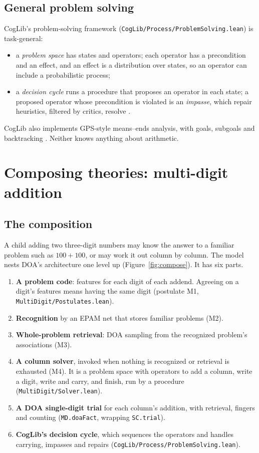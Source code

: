 \documentclass[11pt]{article}
\newcommand{\code}[1]{\texttt{#1}}
\begin{document}
\subsection{General problem solving}
\label{sec:ps}

CogLib's problem-solving framework (\code{CogLib/Process/ProblemSolving.lean}) is task-general:
\begin{itemize}
  \item a \emph{problem space} has states and operators; each operator has a precondition and an effect, and an effect is a distribution over states, so an operator can include a probabilistic process;
  \item a \emph{decision cycle} runs a procedure that proposes an operator in each state; a proposed operator whose precondition is violated is an \emph{impasse}, which repair heuristics, filtered by critics, resolve \citep{brown1980}.
\end{itemize}
CogLib also implements GPS-style means--ends analysis, with goals, subgoals and backtracking \citep{newell1972}. Neither knows anything about arithmetic.

\section{Composing theories: multi-digit addition}
\label{sec:compose}

\subsection{The composition}

A child adding two three-digit numbers may know the answer to a familiar problem such as $100+100$, or may work it out column by column. The model nests DOA's architecture one level up (Figure~\ref{fig:compose}). It has six parts.

\begin{enumerate}
  \item \textbf{A problem code}: features for each digit of each addend. Agreeing on a digit's features means having the same digit (postulate M1, \code{MultiDigit/Postulates.lean}).
  \item \textbf{Recognition} by an EPAM net that stores familiar problems (M2).
  \item \textbf{Whole-problem retrieval}: DOA sampling from the recognized problem's associations (M3).
  \item \textbf{A column solver}, invoked when nothing is recognized or retrieval is exhausted (M4). It is a problem space with operators to add a column, write a digit, write and carry, and finish, run by a procedure (\code{MultiDigit/Solver.lean}).
  \item \textbf{A DOA single-digit trial} for each column's addition, with retrieval, fingers and counting (\code{MD.doaFact}, wrapping \code{SC.trial}).
  \item \textbf{CogLib's decision cycle}, which sequences the operators and handles carrying, impasses and repairs (\code{CogLib/Process/ProblemSolving.lean}).
\end{enumerate}
\end{document}
